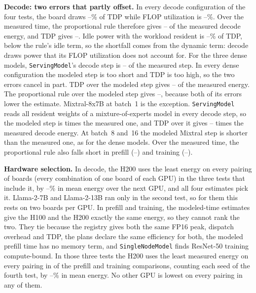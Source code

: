 \documentclass[10pt,twocolumn]{article}
\begin{document}
\textbf{Decode: two errors that partly offset.} In every decode configuration of the four tests, the board draws \EnergyDecodePowerLowPct--\EnergyDecodePowerHighPct\% of TDP while FLOP utilization is \EnergyDecodeUtilLowPct--\EnergyDecodeUtilHighPct\%. Over the measured time, the proportional rule therefore gives \EnergyDecodePropLow--\EnergyDecodePropHigh{} of the measured decode energy, and TDP gives \EnergyDecodeTdpLow--\EnergyDecodeTdpHigh. Idle power with the workload resident is \EnergyIdleLowPct--\EnergyIdleHighPct\% of TDP, below the rule's idle term, so the shortfall comes from the dynamic term: decode draws power that its FLOP utilization does not account for. For the three dense models, \texttt{ServingModel}'s decode step is \EnergyDenseStepLow--\EnergyDenseStepHigh{} of the measured step. In every dense configuration the modeled step is too short and TDP is too high, so the two errors cancel in part. TDP over the modeled step gives \EnergyDenseTdpModeledLow--\EnergyDenseTdpModeledHigh{} of the measured energy. The proportional rule over the modeled step gives \EnergyDensePropModeledLow--\EnergyDensePropModeledHigh, because both of its errors lower the estimate. Mixtral-8x7B at batch~1 is the exception. \texttt{ServingModel} reads all resident weights of a mixture-of-experts model in every decode step, so the modeled step is \EnergyMoeStep{} times the measured one, and TDP over it gives \EnergyMoeTdpModeledLow--\EnergyMoeTdpModeledHigh{} times the measured decode energy. At batch~8 and~16 the modeled Mixtral step is shorter than the measured one, as for the dense models. Over the measured time, the proportional rule also falls short in prefill (\EnergyPrefillPropLow--\EnergyPrefillPropHigh) and training (\EnergyTrainPropLow--\EnergyTrainPropHigh).

\textbf{Hardware selection.} In decode, the H200 uses the least energy on every pairing of boards (every combination of one board of each GPU) in the three tests that include it, by \EnergyDecodeLeadLowPct--\EnergyDecodeLeadHighPct\% in mean energy over the next GPU, and all four estimates pick it. Llama-2-7B and Llama-2-13B ran only in the second test, so for them this rests on two boards per GPU. In prefill and training, the modeled-time estimates give the H100 and the H200 exactly the same energy, so they cannot rank the two. They tie because the registry gives both the same FP16 peak, dispatch overhead and TDP, the plans declare the same efficiency for both, the modeled prefill time has no memory term, and \texttt{SingleNodeModel} finds ResNet-50 training compute-bound. In those three tests the H200 uses the least measured energy on every pairing in \EnergyOtherClear{} of the \EnergyOtherTotal{} prefill and training comparisons, counting each seed of the fourth test, by \EnergyOtherLeadLowPct--\EnergyOtherLeadHighPct\% in mean energy. No other GPU is lowest on every pairing in any of them.
\end{document}
